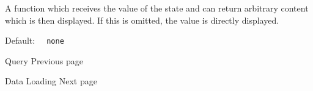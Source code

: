 A function which receives the value of the state and can return
arbitrary content which is then displayed. If this is omitted, the value
is directly displayed.

Default: \texttt{\ }{\texttt{\ none\ }}\texttt{\ }

\href{/docs/reference/introspection/query/}{\pandocbounded{}}

{ Query } { Previous page }

\href{/docs/reference/data-loading/}{\pandocbounded{}}

{ Data Loading } { Next page }


